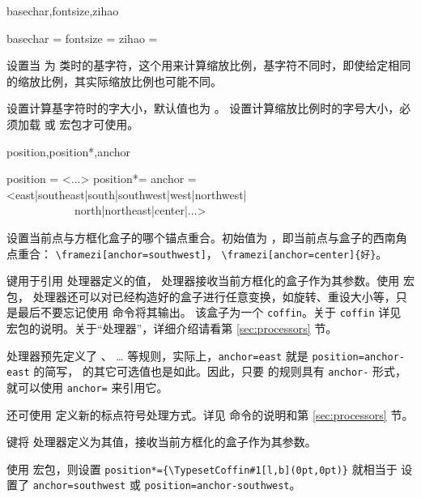 \documentclass{ctxdoc}
\begin{document}
\begin{function}{basechar,fontsize,zihao}
  \begin{syntax}
    basechar =  
    fontsize =  \init{\normalsize}
    zihao = 
  \end{syntax}
   设置当  为  类时的基字符，这个用来计算缩放比例，基字符不同时，即使给定相同的缩放比例，其实际缩放比例也可能不同。

   设置计算基字符时的字大小，默认值也为 。 设置计算缩放比例时的字号大小，必须加载  或  宏包才可使用。
\end{function}

\begin{function}{position,position*,anchor}
  \begin{syntax}
    position = <...>
    position*= 
    anchor   = <east|southeast|south|southwest|west|northwest|
    ~~~~~~~~~~~~north|northeast|center|...> 
  \end{syntax}
   设置当前点与方框化盒子的哪个锚点重合。初始值为 ，即当前点与盒子的西南角点重合：
  \verb|\framezi[anchor=southwest]|，
  \verb|\framezi[anchor=center]{好}|。

   键用于引用  处理器定义的值， 处理器接收当前方框化的盒子作为其参数。使用  宏包，
   处理器还可以对已经构造好的盒子进行任意变换，如旋转、重设大小等，只是最后不要忘记使用  命令将其输出。
  该盒子为一个 \verb|coffin|。关于 \verb|coffin| 详见 \cite{pkg-xcoffins} 宏包的说明。关于“处理器”，详细介绍请看第 \ref{sec:processors} 节。
  
   处理器预先定义了 、 … 等规则，实际上，\verb|anchor=east| 就是 \verb|position=anchor-east| 的简写，
   的其它可选值也是如此。因此，只要  的规则具有 \verb|anchor-| 形式，就可以使用 \verb|anchor=|
  来引用它。

  还可使用  定义新的标点符号处理方式。详见  命令的说明和第 \ref{sec:processors} 节。
  
   键将  处理器定义为其值，接收当前方框化的盒子作为其参数。

  使用  宏包，则设置 \verb|position*={\TypesetCoffin#1[l,b](0pt,0pt)}| 就相当于
  设置了 \verb|anchor=southwest| 或 \verb|position=anchor-southwest|。
\end{function}
\end{document}
